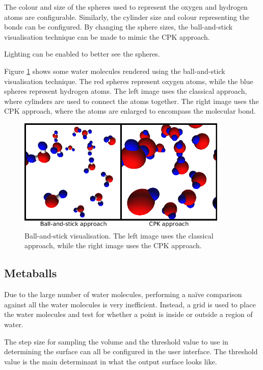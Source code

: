 The colour and size of the spheres used to represent the oxygen and hydrogen
atoms are configurable. Similarly, the cylinder size and colour representing
the bonds can be configured. By changing the sphere sizes, the ball-and-stick
visualisation technique can be made to mimic the CPK approach.

Lighting can be enabled to better see the spheres.

Figure \ref{fig:implementation_ballstick} shows some water molecules rendered
using the ball-and-stick visualisation technique. The red spheres represent
oxygen atoms, while the blue spheres represent hydrogen atoms. The
left image uses the classical approach, where cylinders are used to connect the
atoms together. The right image uses the CPK approach, where the atoms are
enlarged to encompass the molecular bond.

\begin{figure}
  \begin{center}
    \includegraphics[width=100mm]{ballstick}
  \end{center}
  \caption{Ball-and-stick visualisation. The left image uses the classical
  approach, while the right image uses the CPK approach.}
  \label{fig:implementation_ballstick}
\end{figure}


\subsection*{Metaballs}

Due to the large number of water molecules, performing a na\"ive comparison
against all the water molecules is very inefficient. Instead, a grid is used to
place the water molecules and test for whether a point is inside or outside a
region of water.

The step size for sampling the volume and the threshold value to use in
determining the surface can all be configured in the user interface. The
threshold value is the main determinant in what the output surface looks like.


